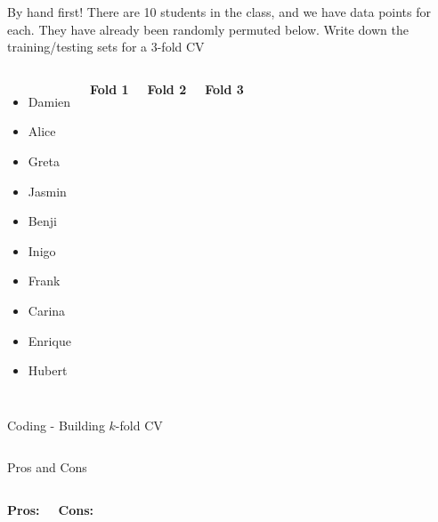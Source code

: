 \documentclass[aspectratio=169,usenames,dvipsnames]{beamer}
\newcommand{\InstructorList}[1]{
\begin{itemize}
	\color{orange}
	#1
\end{itemize}
}
\renewcommand{\InstructorList}[1]{}
\begin{document}
{
\begin{frame}[t]{By hand first!}
There are 10 students in the class, and we have data points for each. They have already been randomly permuted below. 
Write down the training/testing sets for a $3$-fold CV
\begin{columns}
\centering

\begin{itemize}
	\item Damien 
	\item Alice
	\item Greta 
	\item Jasmin
	\item Benji 
	\item Inigo
	\item Frank 
	\item Carina 
	\item Enrique 
	\item Hubert 
\end{itemize}

\centering
\textbf{Fold 1}

\InstructorList{
  \item Test: DAGJ
  \item Train: BIFCEH
}

\vspace{2in}
\centering
\textbf{Fold 2}
\InstructorList{
  \item Test:BIF 
  \item Train: DAGJCEH
}
\vspace{2in}
\centering
\textbf{Fold 3}
\InstructorList{
  \item Test: CEH
  \item Train: DAGJBIF
}
\vspace{2in}
\end{columns}
\end{frame}
}
{
\begin{frame}[t]{Coding - Building $k$-fold CV}
\begin{columns}
\centering
{}
\centering
\end{columns}
\end{frame}
}
\begin{frame}[t]{Pros and Cons}

\begin{columns}
\centering
\textbf{Pros:}
\InstructorList{
\item Cheaper computation with $k = 5$ or $10$ instead of $n$
}
\centering
\textbf{Cons:}
\InstructorList{
\item Unlike LOOCV, there is randomness, but it has lower variability  than validation

}

\end{columns}

\end{frame}
\end{document}
